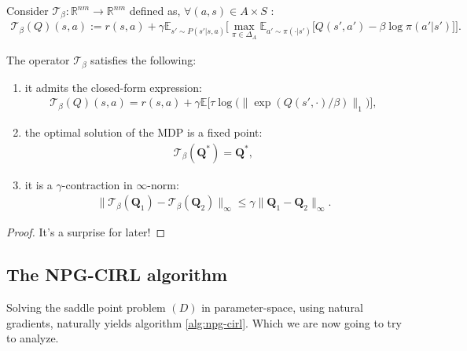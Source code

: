 \begin{definition}
    Consider $\mathcal{T}_\beta:\mathbb{R}^{nm} \rightarrow \mathbb{R}^{nm}$ defined as, $\forall (a,s) \in A \times S$ :
    \begin{align*}
        \mathcal{T}_\beta(Q)(s,a) := r(s,a) 
        + \gamma \mathbb{E}_{s'\sim P(s'|s,a)} \Bigg[
            \max_{\pi \in \Delta_A}
            \mathbb{E}_{a'\sim \pi(\cdot|s')} \Big[
                Q(s',a') - \beta \log \pi(a'|s')
            \Big]
        \Bigg].
    \end{align*}
\end{definition}

\begin{lemma}
    \label{lemma:properties_of_soft_bellman}
    The operator $\mathcal{T}_\beta$ satisfies the following:
    \begin{enumerate}
        \item it admits the closed-form expression:
        \begin{align*}
            \mathcal{T}_\beta (Q)(s,a)
            = r(s,a) 
            + \gamma \mathbb{E} \Big[
                \tau \log \bigl( \| \exp(Q(s',\cdot)/\beta) \|_1 \bigr)
                \Big],
        \end{align*} 
        \item the optimal solution of the MDP is a fixed point:
        \begin{align*}
            \mathcal{T}_\beta (\bm{Q}^*)
            = \bm{Q}^*,
        \end{align*} 
        \item it is a $\gamma$-contraction in $\infty$-norm:
        \begin{align*}
            \| \mathcal{T}_\beta (\bm{Q}_1) - \mathcal{T}_\beta (\bm{Q}_2) \|_\infty
            \leq \gamma \| \bm{Q}_1 - \bm{Q}_2 \|_\infty.
        \end{align*} 
    \end{enumerate}
\end{lemma}


\begin{proof}
    It's a surprise for later! 
\end{proof}


\subsection{The NPG-CIRL algorithm}
Solving the saddle point problem $(D)$ in parameter-space, using natural gradients, naturally yields algorithm \ref{alg:npg-cirl}. Which we are now going to try to analyze.


